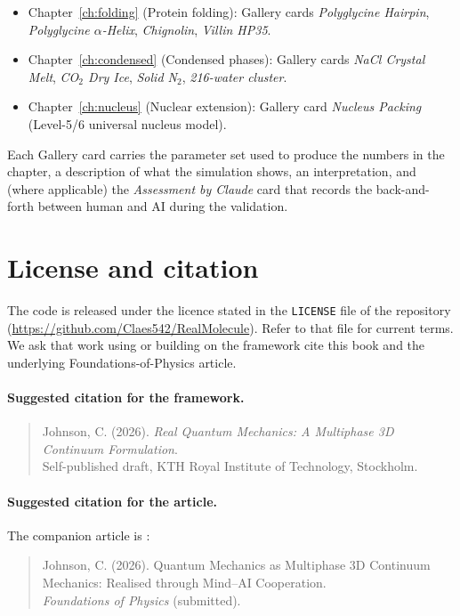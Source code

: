 \begin{itemize}
\begin{itemize}
\end{itemize}
\item Chapter~\ref{ch:folding} (Protein folding): Gallery cards \emph{Polyglycine Hairpin}, \emph{Polyglycine $\alpha$-Helix}, \emph{Chignolin}, \emph{Villin HP35}.
\item Chapter~\ref{ch:condensed} (Condensed phases): Gallery cards \emph{NaCl Crystal Melt}, \emph{CO$_2$ Dry Ice}, \emph{Solid N$_2$}, \emph{216-water cluster}.
\item Chapter~\ref{ch:nucleus} (Nuclear extension): Gallery card \emph{Nucleus Packing} (Level-5/6 universal nucleus model).
\end{itemize}

Each Gallery card carries the parameter set used to produce the numbers in the chapter, a description of what the simulation shows, an interpretation, and (where applicable) the \emph{Assessment by Claude} card that records the back-and-forth between human and AI during the validation.

\section{License and citation}\label{sec:license-cite}

The code is released under the licence stated in the \texttt{LICENSE} file of the repository (\url{https://github.com/Claes542/RealMolecule}). Refer to that file for current terms. We ask that work using or building on the framework cite this book and the underlying Foundations-of-Physics article.

\paragraph{Suggested citation for the framework.}
\begin{quote}
Johnson, C. (2026). \emph{Real Quantum Mechanics: A Multiphase 3D Continuum Formulation}. \\
Self-published draft, KTH Royal Institute of Technology, Stockholm.
\end{quote}

\paragraph{Suggested citation for the article.}
The companion article is \cite{Johnson2026FoP}:
\begin{quote}
Johnson, C. (2026). Quantum Mechanics as Multiphase 3D Continuum Mechanics: Realised through Mind--AI Cooperation. \\
\emph{Foundations of Physics} (submitted).
\end{quote}


